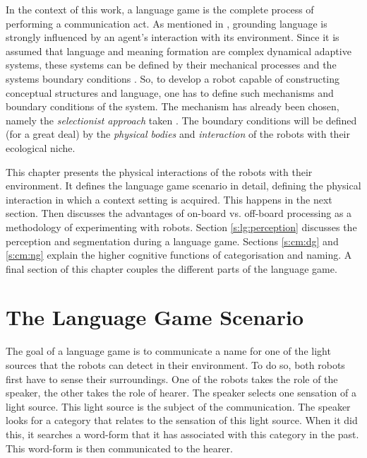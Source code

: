 

In the context of this work, a language game is the complete process of performing a communication act. As mentioned in , grounding language is strongly influenced by an agent's interaction with its environment. Since it is assumed that language and meaning formation are complex dynamical adaptive systems, these systems can be defined by their mechanical processes and the systems boundary conditions \citep{prigogine}. So, to develop a robot capable of constructing conceptual structures and language, one has to define such mechanisms and boundary conditions of the system. The mechanism has already been chosen, namely the {\em selectionist approach} taken \citep{steels:1996a,steels:1996b}. The boundary conditions will be defined (for a great deal) by the {\em physical bodies} and {\em interaction} of the robots with their ecological niche. 


This chapter presents the physical interactions of the robots with their environment. It defines the language game scenario in detail, defining the physical interaction in which a context setting is acquired. This happens in the next section. Then  discusses the advantages of on-board vs. off-board processing as a methodology of experimenting with robots.  Section \ref{s:lg:perception} discusses the perception and segmentation during a language game. Sections \ref{s:cm:dg} and \ref{s:cm:ng} explain the higher cognitive functions of categorisation and naming. A final section of this chapter couples the different parts of the language game.


\section{The Language Game Scenario}\label{s:lg:scenario}



The goal of a language game is to communicate a name for one of the light sources that the robots can detect in their environment. To do so, both robots first have to sense their surroundings. One of the robots takes the role of the speaker, the other takes the role of hearer. The speaker selects one sensation of a light source. This light source is the subject of the communication. The speaker looks for a category that relates to the sensation of this light source. When it did this, it searches a word-form that it has associated with this category in the past. This word-form is then communicated to the hearer. 

